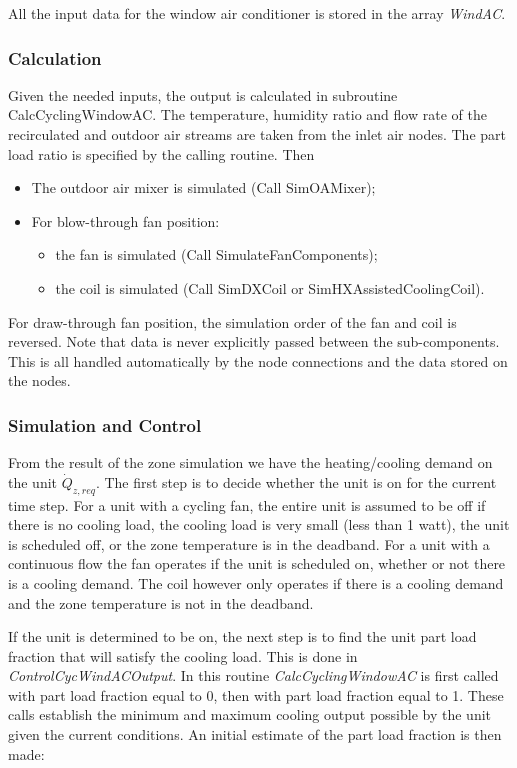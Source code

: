 All the input data for the window air conditioner is stored in the array \emph{WindAC}.

\subsubsection{Calculation}\label{calculation-4}

Given the needed inputs, the output is calculated in subroutine CalcCyclingWindowAC. The temperature, humidity ratio and flow rate of the recirculated and outdoor air streams are taken from the inlet air nodes. The part load ratio is specified by the calling routine. Then

\begin{itemize}
\item The outdoor air mixer is simulated (Call SimOAMixer);
\item For blow-through fan position:
\begin{itemize}
\item the fan is simulated (Call SimulateFanComponents);
\item the coil is simulated (Call SimDXCoil or SimHXAssistedCoolingCoil).
\end{itemize}
\end{itemize}

For draw-through fan position, the simulation order of the fan and coil is reversed. Note that data is never explicitly passed between the sub-components. This is all handled automatically by the node connections and the data stored on the nodes.

\subsubsection{Simulation and Control}\label{simulation-and-control-4-000}

From the result of the zone simulation we have the heating/cooling demand on the unit \({\dot Q_{z,req}}\). The first step is to decide whether the unit is on for the current time step. For a unit with a cycling fan, the entire unit is assumed to be off if there is no cooling load, the cooling load is very small (less than 1 watt), the unit is scheduled off, or the zone temperature is in the deadband. For a unit with a continuous flow the fan operates if the unit is scheduled on, whether or not there is a cooling demand. The coil however only operates if there is a cooling demand and the zone temperature is not in the deadband.

If the unit is determined to be on, the next step is to find the unit part load fraction that will satisfy the cooling load. This is done in \emph{ControlCycWindACOutput}. In this routine \emph{CalcCyclingWindowAC} is first called with part load fraction equal to 0, then with part load fraction equal to 1. These calls establish the minimum and maximum cooling output possible by the unit given the current conditions. An initial estimate of the part load fraction is then made:

